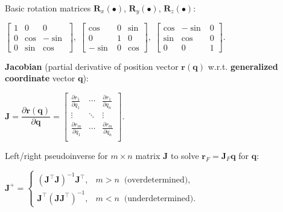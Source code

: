 \documentclass[landscape]{article}
\newcommand{\vmspace}{\vspace{-7pt}}
\newcommand{\vpspace}{\vspace{5pt}}
\begin{document}
\begin{multicols}{3}
\begin{minipage}{\columnwidth}
  Basic rotation matrices $\mathbf R_x(\bullet)$, $\mathbf R_y(\bullet)$, $\mathbf
  R_z(\bullet)$:
  \vmspace
  \begin{center}
    $\left[\begin{matrix}
      1 & 0 & 0 \\
      0 & \cos & -\sin \\
      0 & \sin & \cos
    \end{matrix}\right],\;
    \left[\begin{matrix}
      \cos & 0 & \sin \\
      0 & 1 & 0 \\
      -\sin & 0 & \cos
    \end{matrix}\right],\;
    \left[\begin{matrix}
      \cos & -\sin & 0 \\
      \sin & \cos & 0 \\
      0 & 0 & 1
    \end{matrix}\right].$
  \end{center}
\end{minipage}

\vpspace

\begin{minipage}{\columnwidth}
  \textbf{Jacobian} (partial derivative of position vector $\mathbf{r}(\mathbf
  q)$ w.r.t. \textbf{generalized coordinate} vector $\mathbf{q}$):
  \vmspace
  \begin{center}
    $
    \mathbf J
    =
    \dfrac{\partial \mathbf{r}(\mathbf q)}{\partial \mathbf q}
    =
    \left[
    \begin{matrix}
      \frac{\partial r_1}{\partial q_1} & \cdots & \frac{\partial r_1}{\partial
      q_n} \\
      \vdots & \ddots & \vdots \\
      \frac{\partial r_m}{\partial q_1} & \cdots & \frac{\partial r_m}{\partial
      q_n} \\
    \end{matrix}
    \right]
    $.
  \end{center}
\end{minipage}

\vpspace

\begin{minipage}{\columnwidth}
  Left/right pseudoinverse for $m \times n$ matrix $\mathbf{J}$ to solve
  $\mathbf r_F = \mathbf J_F \mathbf q$ for $\mathbf q$:
  \vmspace
  \begin{center}
    $\mathbf{J}^+=
    \begin{cases}
      (\mathbf{J}^\intercal \mathbf J)^{-1} \mathbf J^\intercal, & m>n\;\;
      \text{(overdetermined)},\\
      \mathbf J^\intercal (\mathbf{J} \mathbf J^\intercal)^{-1}, & m<n\;\;
      \text{(underdetermined).}
    \end{cases}$
  \end{center}
\end{minipage}


\end{multicols}
\end{document}
